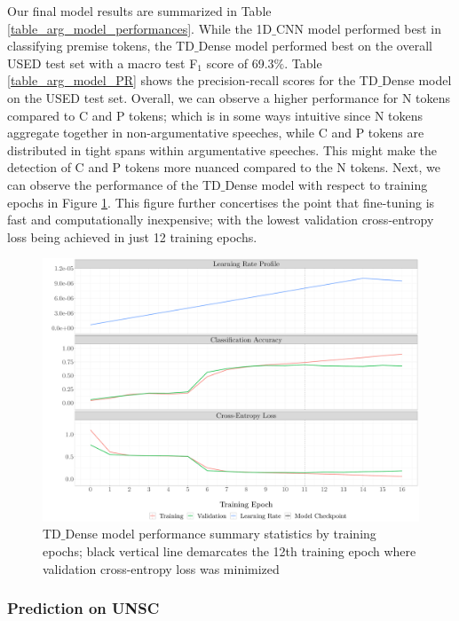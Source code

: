 Our final model results are summarized in Table \ref{table_arg_model_performances}. While the 1D$\_$CNN model performed best in classifying premise tokens, the TD$\_$Dense model performed best on the overall USED test set with a macro test F$_1$ score of 69.3$\%$. Table \ref{table_arg_model_PR} shows the precision-recall scores for the TD$\_$Dense model on the USED test set. Overall, we can observe a higher performance for N tokens compared to C and P tokens; which is in some ways intuitive since N tokens aggregate together in non-argumentative speeches, while C and P tokens are distributed in tight spans within argumentative speeches. This might make the detection of C and P tokens more nuanced compared to the N tokens. Next, we can observe the performance of the TD$\_$Dense model with respect to training epochs in Figure \ref{model_performance}. This figure further concertises the point that fine-tuning is fast and computationally inexpensive; with the lowest validation cross-entropy loss being achieved in just 12 training epochs.

\begin{figure}[t!]
    \centering
    \includegraphics[trim={1.0cm 0cm 0cm 0cm},clip,width=\textwidth]{img/model_training_evolution.pdf}
    \caption{TD$\_$Dense model performance summary statistics by training epochs; black vertical line demarcates the 12th training epoch where validation cross-entropy loss was minimized}
    \label{model_performance}
\end{figure}

\subsubsection{Prediction on UNSC}

